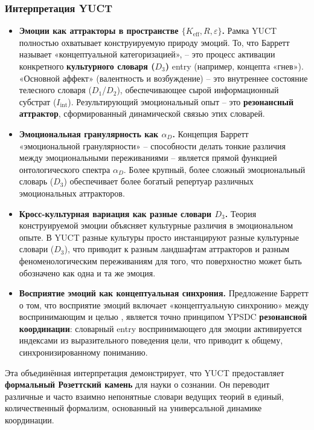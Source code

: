 \documentclass[12pt,a4paper]{article}
\begin{document}
	\subsubsection*{Интерпретация YUCT}
	\begin{itemize}
		\item \textbf{Эмоции как аттракторы в пространстве \(\{K_{\mathrm{eff}}, R, \varepsilon\}\).} Рамка YUCT полностью охватывает конструируемую природу эмоций. То, что Барретт называет «концептуальной категоризацией», – это процесс активации конкретного \textbf{культурного словаря (\(D_3\))} entry (например, концепта «гнев»). «Основной аффект» (валентность и возбуждение) – это внутреннее состояние телесного словаря (\(D_1\)/\(D_2\)), обеспечивающее сырой информационный субстрат (\(I_{\mathrm{int}}\)). Результирующий эмоциональный опыт – это \textbf{резонансный аттрактор}, сформированный динамической связью этих словарей.
		\item \textbf{Эмоциональная гранулярность как \(\alpha_D\).} Концепция Барретт «эмоциональной гранулярности» – способности делать тонкие различия между эмоциональными переживаниями \cite{Barrett2025} – является прямой функцией онтологического спектра \(\alpha_D\). Более крупный, более сложный эмоциональный словарь (\(D_3\)) обеспечивает более богатый репертуар различных эмоциональных аттракторов.
		\item \textbf{Кросс-культурная вариация как разные словари \(D_3\).} Теория конструируемой эмоции объясняет культурные различия в эмоциональном опыте. В YUCT разные культуры просто инстанцируют разные культурные словари (\(D_3\)), что приводит к разным ландшафтам аттракторов и разным феноменологическим переживаниям для того, что поверхностно может быть обозначено как одна и та же эмоция.
		\item \textbf{Восприятие эмоций как концептуальная синхрония.} Предложение Барретт о том, что восприятие эмоций включает «концептуальную синхронию» между воспринимающим и целью \cite{Gendron2018}, является точно принципом YPSDC \textbf{резонансной координации}: словарный entry воспринимающего для эмоции активируется индексами из выразительного поведения цели, что приводит к общему, синхронизированному пониманию.
	\end{itemize}
	
	Эта объединённая интерпретация демонстрирует, что YUCT предоставляет \textbf{формальный Розеттский камень} для науки о сознании. Он переводит различные и часто взаимно непонятные словари ведущих теорий в единый, количественный формализм, основанный на универсальной динамике координации.
	
\end{document}

